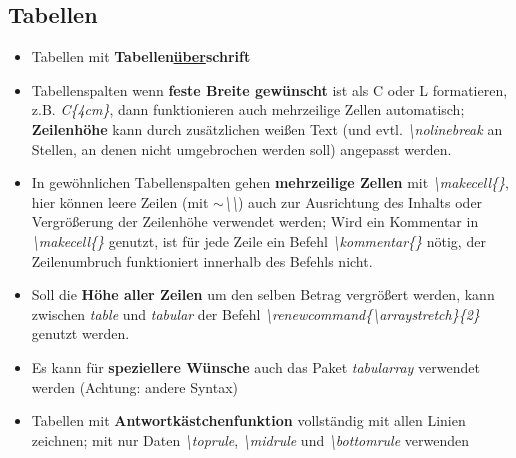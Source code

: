 \documentclass[../main.tex]{subfiles}
\begin{document}
\subsection{Tabellen}
\begin{itemize}
    \item Tabellen mit \textbf{Tabellen\underline{\"uber}schrift}
    \item Tabellenspalten wenn \textbf{feste Breite gew\"unscht} ist als C oder L formatieren, z.B. \textit{C\{4cm\}}, dann funktionieren auch mehrzeilige Zellen automatisch; \textbf{Zeilenh\"ohe} kann durch zus\"atzlichen wei\ss{}en Text (und evtl. \textit{\textbackslash nolinebreak} an Stellen, an denen nicht umgebrochen werden soll) angepasst werden. 
    \item In gew\"ohnlichen Tabellenspalten gehen \textbf{mehrzeilige Zellen} mit \textit{\textbackslash makecell\{\}}, hier k\"onnen leere Zeilen (mit \textit{$\sim$\textbackslash\textbackslash}) auch zur Ausrichtung des Inhalts oder Vergr\"o\ss{}erung der Zeilenh\"ohe verwendet werden; Wird ein Kommentar in \textit{\textbackslash makecell\{\}} genutzt, ist f\"ur jede Zeile ein Befehl \textit{\textbackslash kommentar\{\}} n\"otig, der Zeilenumbruch funktioniert innerhalb des Befehls nicht.
    \item Soll die \textbf{H\"ohe aller Zeilen} um den selben Betrag vergr\"o\ss{}ert werden, kann zwischen \textit{table} und \textit{tabular} der Befehl \textit{\textbackslash renewcommand\{\textbackslash arraystretch\}\{2\}} genutzt werden.
    \item Es kann f\"ur \textbf{speziellere W\"unsche} auch das Paket \textit{tabularray} verwendet werden (Achtung: andere Syntax)
    \item Tabellen mit \textbf{Antwortk\"astchenfunktion} vollst\"andig mit allen Linien zeichnen; mit nur Daten \textit{\hypertarget{toprule}{\textbackslash toprule}}, \textit{\hypertarget{midrule}{\textbackslash midrule}} und \textit{\hypertarget{bottomrule}{\textbackslash bottomrule}} verwenden
\end{itemize}
\end{document}
